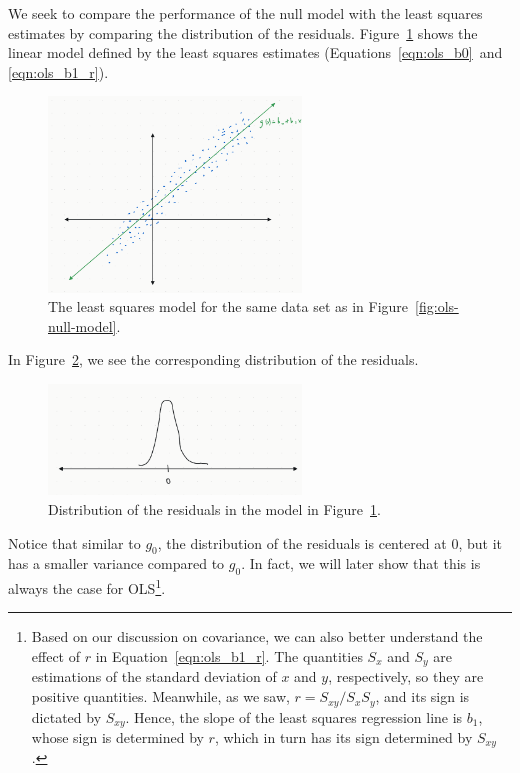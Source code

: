 \documentclass[12pt, a4paper]{article}
\theoremstyle{definition}
\begin{document}
	We seek to compare the performance of the null model with the least squares
	estimates by comparing the distribution of the residuals. Figure~\ref{fig:ols-least-squares-model}
	shows the linear model defined by the least squares estimates (Equations~\ref{eqn:ols_b0}~and~
	\ref{eqn:ols_b1_r}).
	\begin{figure}
		\centering
		\includegraphics[width=0.6\textwidth]{ols-least-squares-estimate}
		\caption{The least squares model for the same data set as in Figure~\ref{fig:ols-null-model}.}
		\label{fig:ols-least-squares-model}
	\end{figure}
	In Figure~\ref{fig:ols-residuals-distribution-least-squares}, we see the
	corresponding distribution of the residuals.
	\begin{figure}
		\centering
		\includegraphics[width=0.6\textwidth]{ols-residual-distribution-least-squares-model}
		\caption{Distribution of the residuals in the model in Figure~\ref{fig:ols-least-squares-model}.}
		\label{fig:ols-residuals-distribution-least-squares}
	\end{figure}
	Notice that similar to $g_0$, the distribution of the residuals is centered at $0$,
	but it has a smaller variance compared to $g_0$. In fact, we will later show that this
	is always the case for OLS\footnote{Based on our discussion on covariance, we can also
		better understand the effect of $r$ in Equation~\ref{eqn:ols_b1_r}. The quantities
		$S_x$ and $S_y$ are estimations
		of the standard deviation of $x$ and $y$, respectively, so they are positive quantities.
		Meanwhile, as we saw, $r=S_{xy}/S_xS_y$, and its sign is dictated by $S_{xy}$.
		Hence, the slope of the least squares regression line is $b_1$, whose sign is determined
		by $r$, which in turn has its sign determined by $S_{xy}$.
	}.
\end{document}
